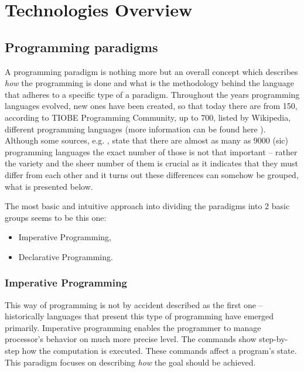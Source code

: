 \section{Technologies Overview}
\subsection{Programming paradigms}
    A programming paradigm is nothing more but an overall concept which describes \textit{how} the programming is done and what is the methodology behind the language that adheres to a specific type of a paradigm. Throughout the years programming languages evolved, new ones have been created, so that today there are from 150, according to TIOBE Programming Community, up to 700, listed by Wikipedia, different programming languages (more information can be found here \cite{numberOfProgrammingLanguages}). Although some sources, e.g. \cite{numberOfProgrammingLanguages_hopl_info}, state that there are almost as many as 9000 (sic) programming languages the exact number of those is not that important -- rather the variety and the sheer number of them is crucial as it indicates that they must differ from each other and it turns out these differences can somehow be grouped, what is presented below.
    
    The most basic and intuitive approach into dividing the paradigms into 2 basic groups seems to be this one:
    \begin{itemize}
        \item Imperative Programming,
        \item Declarative Programming.
    \end{itemize}
    
    \subsubsection{Imperative Programming}
    This way of programming is not by accident described as the first one -- historically languages that present this type of programming have emerged primarily. Imperative programming enables the programmer to manage processor's behavior on much more precise level. The commands show step-by-step how the computation is executed. These commands affect a program's state. This paradigm focuses on describing \textit{how} the goal should be achieved.
    
